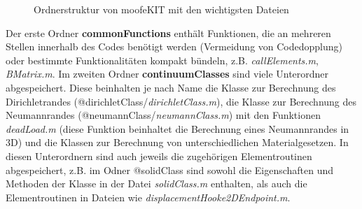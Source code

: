 \documentclass[12pt,bibstyle=none,pagenumberinfooter]{ifmdocument}
\begin{document}
\begin{figure}[H]
\DTsetlength{0.2em}{3em}{0.2em}{0.4pt}{2.6pt}
\caption{Ordnerstruktur von moofeKIT mit den wichtigsten Dateien}
\label{fig:moofeKITFolderStructure}
\end{figure}


Der erste Ordner \textbf{commonFunctions} enth\"alt Funktionen, die an mehreren Stellen innerhalb des Codes benötigt werden (Vermeidung von Codedopplung) oder bestimmte Funktionalitäten kompakt bündeln, z.B. \textit{callElements.m}, \textit{BMatrix.m}. Im zweiten Ordner \textbf{continuumClasses} sind viele Unterordner abgespeichert. Diese beinhalten je nach Name die Klasse zur Berechnung des Dirichletrandes (@dirichletClass/\textit{dirichletClass.m}), die Klasse zur Berechnung des Neumannrandes (@neumannClass/\textit{neumannClass.m}) mit den Funktionen \textit{deadLoad.m} (diese Funktion beinhaltet die Berechnung eines Neumannrandes in 3D) und die Klassen zur Berechnung von unterschiedlichen Materialgesetzen. In diesen Unterordnern sind auch jeweils die zugeh\"origen Elementroutinen abgespeichert, z.B. im Odner @solidClass sind sowohl die Eigenschaften und Methoden der Klasse in der Datei \textit{solidClass.m} enthalten, als auch die Elementroutinen in Dateien wie \textit{displacementHooke2DEndpoint.m}. 
\end{document}
